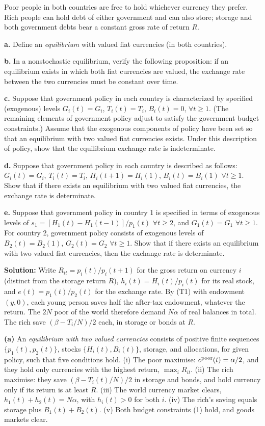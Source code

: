 \documentclass[12pt, letterpaper]{article}
\begin{document}
\begin{tcolorbox}[evenbox,title={Exercise 9.6 \quad Exchange rate determinacy}]
\begin{tcolorbox}[questionbox]
Poor people in both countries are free to hold whichever currency they prefer. Rich people can hold
debt of either government and can also store; storage and both government debts bear a constant
gross rate of return $R$.

\textbf{a.} Define an \emph{equilibrium} with valued fiat currencies (in both countries).

\textbf{b.} In a nonstochastic equilibrium, verify the following proposition: if an equilibrium
exists in which both fiat currencies are valued, the exchange rate between the two currencies must
be constant over time.

\textbf{c.} Suppose that government policy in each country is characterized by specified
(exogenous) levels $G_i(t)=G_i$, $T_i(t)=T_i$, $B_i(t)=0$, $\forall t\ge1$. (The remaining elements
of government policy adjust to satisfy the government budget constraints.) Assume that the exogenous
components of policy have been set so that an equilibrium with two valued fiat currencies exists.
Under this description of policy, show that the equilibrium exchange rate is indeterminate.

\textbf{d.} Suppose that government policy in each country is described as follows:
$G_i(t)=G_i$, $T_i(t)=T_i$, $H_i(t+1)=H_i(1)$, $B_i(t)=B_i(1)$ $\forall t\ge1$. Show that if there
exists an equilibrium with two valued fiat currencies, the exchange rate is determinate.

\textbf{e.} Suppose that government policy in country 1 is specified in terms of exogenous levels of
$s_1=[H_1(t)-H_1(t-1)]/p_1(t)$ $\forall t\ge2$, and $G_1(t)=G_1$ $\forall t\ge1$. For country 2,
government policy consists of exogenous levels of $B_2(t)=B_2(1)$, $G_2(t)=G_2$ $\forall t\ge1$. Show
that if there exists an equilibrium with two valued fiat currencies, then the exchange rate is
determinate.
\end{tcolorbox}

\textbf{Solution:} Write $R_{it}=p_i(t)/p_i(t+1)$ for the gross return on currency $i$ (distinct from
the storage return $R$), $h_i(t)=H_i(t)/p_i(t)$ for its real stock, and $e(t)=p_1(t)/p_2(t)$ for the
exchange rate. By (T1) with endowment $(y,0)$, each young person saves half the after-tax endowment,
whatever the return. The $2N$ poor of the world therefore demand $N\alpha$ of real balances in total.
The rich save $(\beta-T_i/N)/2$ each, in storage or bonds at $R$.

\textbf{(a)} An \emph{equilibrium with two valued currencies} consists of positive finite sequences
$\{p_1(t),p_2(t)\}$, stocks $\{H_i(t),B_i(t)\}$, storage, and allocations, for given policy, such that
five conditions hold.
(i) The poor maximise: $c^{\rm poor}(t)=\alpha/2$, and they hold only currencies with the highest
return, $\max_iR_{it}$.
(ii) The rich maximise: they save $(\beta-T_i(t)/N)/2$ in storage and bonds, and hold currency only
if its return is at least $R$.
(iii) The world currency market clears, $h_1(t)+h_2(t)=N\alpha$, with $h_i(t)>0$ for both $i$.
(iv) The rich's saving equals storage plus $B_1(t)+B_2(t)$.
(v) Both budget constraints (1) hold, and goods markets clear.


\end{tcolorbox}
\end{document}
